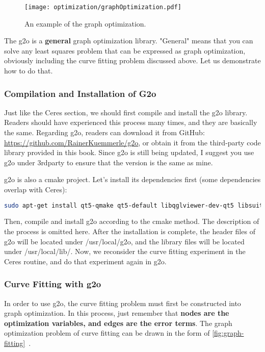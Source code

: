 \begin{figure}[!ht]
    \centering
    \texttt{[image: optimization/graphOptimization.pdf]}
    \caption{An example of the graph optimization.}
    \label{fig:graph-optimization}
\end{figure}

The g2o is a \textbf{general} graph optimization library. "General" means that you can solve any least squares problem that can be expressed as graph optimization, obviously including the curve fitting problem discussed above. Let us demonstrate how to do that.

\subsubsection{Compilation and Installation of G2o}
Just like the Ceres section, we should first compile and install the g2o library. Readers should have experienced this process many times, and they are basically the same. Regarding g2o, readers can download it from GitHub: \url{https://github.com/RainerKuemmerle/g2o}, or obtain it from the third-party code library provided in this book. Since g2o is still being updated, I suggest you use g2o under 3rdparty to ensure that the version is the same as mine.

g2o is also a cmake project. Let's install its dependencies first (some dependencies overlap with Ceres):
\begin{lstlisting}[language=sh,caption=terminal input:]
    sudo apt-get install qt5-qmake qt5-default libqglviewer-dev-qt5 libsuitesparse-dev libcxsparse3 libcholmod3
\end{lstlisting}

Then, compile and install g2o according to the cmake method. The description of the process is omitted here. After the installation is complete, the header files of g2o will be located under /usr/local/g2o, and the library files will be located under /usr/local/lib/. Now, we reconsider the curve fitting experiment in the Ceres routine, and do that experiment again in g2o.

\subsubsection{Curve Fitting with g2o}
In order to use g2o, the curve fitting problem must first be constructed into graph optimization. In this process, just remember that \textbf{nodes are the optimization variables, and edges are the error terms}. The graph optimization problem of curve fitting can be drawn in the form of \autoref{fig:graph-fitting}~.

